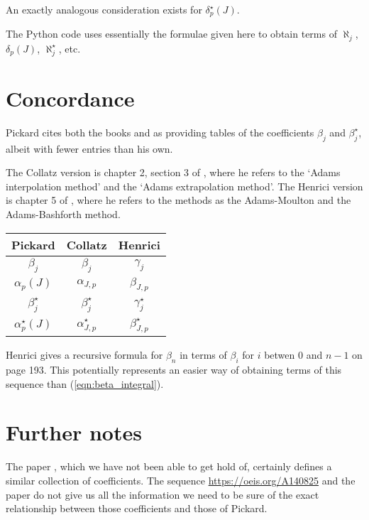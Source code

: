\documentclass{article}
\begin{document}
An exactly analogous consideration exists for $\delta^{\star}_p(J)$.

The Python code \cite{python} uses essentially the formulae given here to obtain terms of $\aleph_j$, $\delta_p(J)$, $\aleph^{\star}_j$, etc.

\section{Concordance}
Pickard cites both the books \cite{collatz} and \cite{henrici} as providing tables of the coefficients $\beta_j$ and $\beta^{\star}_j$, albeit with fewer entries than his own.

The Collatz version is chapter 2, section 3 of \cite{collatz}, where he refers to the `Adams interpolation method' and the `Adams extrapolation method'. The Henrici version is chapter 5 of \cite{henrici}, where he refers to the methods as the Adams-Moulton and the Adams-Bashforth method.

\begin{center}
\begin{tabular}{|c|c|c|}
\hline
Pickard \cite{pickard} & Collatz \cite{collatz} & Henrici \cite{henrici} \\ 
\hline
$\beta_j$ & $\beta_j$ & $\gamma_j$ \\
$\alpha_p(J)$ & $\alpha_{J, p}$ & $\beta_{J, p}$ \\
$\beta^{\star}_j$ & $\beta_j^{\star}$ & $\gamma^{\star}_j$ \\
$\alpha^{\star}_p(J)$ & $\alpha^{\star}_{J, p}$ & $\beta^{\star}_{J, p}$ \\
\hline
\end{tabular}
\end{center}

Henrici gives a recursive formula for $\beta_n$ in terms of $\beta_i$ for $i$ betwen $0$ and $n-1$ on page 193. This potentially represents an easier way of obtaining terms of this sequence than (\ref{eqn:beta_integral}).

\section{Further notes}
The paper \cite{curtz}, which we have not been able to get hold of, certainly defines a similar collection of coefficients. The sequence \url{https://oeis.org/A140825} and the paper \cite{flajolet} do not give us all the information we need to be sure of the exact relationship between those coefficients and those of Pickard.




\end{document}
